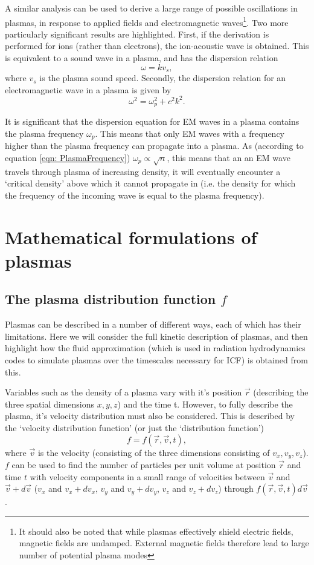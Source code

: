 A similar analysis can be used to derive a large range of possible oscillations in plasmas, in response to applied fields and electromagnetic waves\footnote{It should also be noted that while plasmas effectively shield electric fields, magnetic fields are undamped. External magnetic fields therefore lead to large number of potential plasma modes}. Two more particularly significant results are highlighted. First, if the derivation is performed for ions (rather than electrons), the ion-acoustic wave is obtained. This is equivalent to a sound wave in a plasma, and has the dispersion relation
\begin{equation} \omega = k v_s, \end{equation} where $v_s$ is the plasma sound speed. Secondly, the dispersion relation for an electromagnetic wave in a plasma is given by 
\begin{equation} \omega^2 = \omega_p^2 + c^2k^2. \end{equation}

It is significant that the dispersion equation for EM waves in a plasma contains the plasma frequency $\omega_p$. This means that only EM waves with a frequency higher than the plasma frequency can propagate into a plasma. As (according to equation \ref{eqn: PlasmaFrequency}) $\omega_p \propto \sqrt{n}$, this means that an an EM wave travels through plasma of increasing density, it will eventually encounter a `critical density' above which it cannot propagate in (i.e. the density for which the frequency of the incoming wave is equal to the plasma frequency). 

\section{Mathematical formulations of plasmas}

\subsection{The plasma distribution function $f$}
Plasmas can be described in a number of different ways, each of which has their limitations. Here we will consider the full kinetic description of plasmas, and then highlight how the fluid approximation (which is used in radiation hydrodynamics codes to simulate plasmas over the timescales necessary for ICF) is obtained from this.

Variables such as the density of a plasma vary with it's position $\vec{r}$ (describing the three spatial dimensions $x,y,z$) and the time t. However, to fully describe the plasma, it's velocity distribution must also be considered. This is described by the `velocity distribution function' (or just the `distribution function') \begin{equation} f = f(\vec{r}, \vec{v}, t), \end{equation} where $\vec{v}$ is the velocity (consisting of the three dimensions consisting of $v_x, v_y, v_z$). $f$ can be used to find the number of particles per unit volume at position $\vec{r}$ and time $t$ with velocity components in a small range of velocities between $\vec{v}$ and $\vec{v} + d\vec{v}$ ($v_x$ and $v_x + dv_x$, $v_y$ and $v_y + dv_y$, $v_z$ and $v_z + dv_z$) through $f(\vec{r}, \vec{v}, t) d\vec{v}$.

